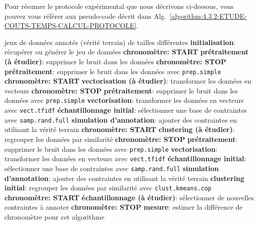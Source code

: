 			Pour résumer le protocole expérimental que nous décrivons ci-dessous, vous pouvez vous référer aux pseudo-code décrit dans Alg.~\ref{algorithm:4.3.2-ETUDE-COUTS-TEMPS-CALCUL-PROTOCOLE}.
			\begin{algorithm}[!htb]
				\begin{algorithmic}[1]
					\Require jeux de données annotés (vérité terrain) de tailles différentes
						\State \textbf{initialisation}: récupérer ou générer le jeu de données
							\State \textbf{chronomètre: START}
							\State \textbf{prétraitement (à étudier)}: supprimer le bruit dans les données
							\State \textbf{chronomètre: STOP}
							\State \textbf{prétraitement}: supprimer le bruit dans les données avec \texttt{prep.simple}
							\State \textbf{chronomètre: START}
							\State \textbf{vectorisation (à étudier)}: transformer les données en vecteurs
							\State \textbf{chronomètre: STOP}
							\State \textbf{prétraitement}: supprimer le bruit dans les données avec \texttt{prep.simple}
							\State \textbf{vectorisation}: transformer les données en vecteurs avec \texttt{vect.tfidf}
							\State \textbf{échantillonnage initial}: sélectionner une base de contraintes avec \texttt{samp.rand.full}
							\State \textbf{simulation d'annotation}: ajouter des contraintes en utilisant la vérité terrain
							\State \textbf{chronomètre: START}
							\State \textbf{clustering (à étudier)}: regrouper les données par similarité
							\State \textbf{chronomètre: STOP}
							\State \textbf{prétraitement}: supprimer le bruit dans les données avec \texttt{prep.simple}
							\State \textbf{vectorisation}: transformer les données en vecteurs avec \texttt{vect.tfidf}
							\State \textbf{échantillonnage initial}: sélectionner une base de contraintes avec \texttt{samp.rand.full}
							\State \textbf{simulation d'annotation}: ajouter des contraintes en utilisant la vérité terrain
							\State \textbf{clustering initial}: regrouper les données par similarité avec \texttt{clust.kmeans.cop}
							\State \textbf{chronomètre: START}
							\State \textbf{échantillonnage (à étudier)}: sélectionner de nouvelles contraintes à annoter
							\State \textbf{chronomètre: STOP}
						\EndIf
						\State \textbf{mesure}: estimer la différence de chronomètre pour cet algorithme

\end{algorithmic}
\end{algorithm}
